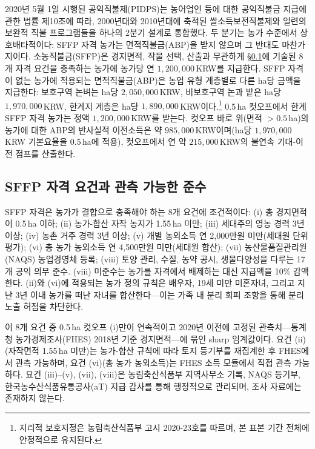 \documentclass[12pt, a4paper]{article}
\begin{document}
2020년 5월 1일 시행된 공익직불제(PIDPS)는 농어업인 등에 대한 공익직불금 지급에 관한 법률 제10조에 따라, 2000년대와 2010년대에 축적된 쌀소득보전직불제와 일련의 보완적 직불 프로그램들을 하나의 2분기 설계로 통합했다. 두 분기는 농가 수준에서 상호배타적이다: SFFP 자격 농가는 면적직불금(ABP)을 받지 않으며 그 반대도 마찬가지이다. 소농직불금(SFFP)은 경지면적, 작물 선택, 산출과 무관하게 \S\ref{sec:institutional-eligibility}에 기술된 8개 자격 요건을 충족하는 농가에 농가당 연 $1{,}200{,}000$\,KRW를 지급한다. SFFP 자격이 없는 농가에 적용되는 면적직불금(ABP)은 농업 유형 계층별로 다른 ha당 금액을 지급한다: 보호구역 논벼는 ha당 $2{,}050{,}000$\,KRW, 비보호구역 논과 밭은 ha당 $1{,}970{,}000$\,KRW, 한계지 계층은 ha당 $1{,}890{,}000$\,KRW이다.\footnote{지리적 보호지정은 농림축산식품부 고시 2020-23호를 따르며, 본 표본 기간 전체에 안정적으로 유지된다.} 0.5\,ha 컷오프에서 한계 SFFP 자격 농가는 정액 $1{,}200{,}000$\,KRW를 받는다. 컷오프 바로 위(면적 $> 0.5$\,ha)의 농가에 대한 ABP의 반사실적 이전소득은 약 $985{,}000$\,KRW이며(ha당 $1{,}970{,}000$\,KRW 기본요율을 $0.5$\,ha에 적용), 컷오프에서 연 약 $215{,}000$\,KRW의 불연속 기대-이전 점프를 산출한다.

\subsection{SFFP 자격 요건과 관측 가능한 준수}
\label{sec:institutional-eligibility}

SFFP 자격은 농가가 결합으로 충족해야 하는 8개 요건에 조건적이다: (i) 총 경지면적이 0.5\,ha 이하; (ii) 농가-합산 자작 농지가 1.55\,ha 미만; (iii) 세대주의 영농 경력 3년 이상; (iv) 농촌 거주 경력 3년 이상; (v) 개별 농외소득 연 2,000만원 미만(세대원 단위 평가); (vi) 총 농가 농외소득 연 4,500만원 미만(세대원 합산); (vii) 농산물품질관리원(NAQS) 농업경영체 등록; (viii) 토양 관리, 수질, 농약 공시, 생물다양성을 다루는 17개 공익 의무 준수. (viii) 미준수는 농가를 자격에서 배제하는 대신 지급액을 10\% 감액한다. (ii)와 (vi)에 적용되는 농가 정의 규칙은 배우자, 19세 미만 미혼자녀, 그리고 지난 3년 이내 농가를 떠난 자녀를 합산한다---이는 가족 내 분리 회피 조항을 통해 분리 노출 허점을 차단한다.

이 8개 요건 중 0.5\,ha 컷오프 (i)만이 연속적이고 2020년 이전에 고정된 관측치---통계청 농가경제조사(FHES) 2018년 기준 경지면적---에 묶인 sharp 임계값이다. 요건 (ii)(자작면적 1.55\,ha 미만)는 농가-합산 규칙에 따라 토지 등기부를 재집계한 후 FHES에서 관측 가능하며, 요건 (vi)(총 농가 농외소득)는 FHES 소득 모듈에서 직접 관측 가능하다. 요건 (iii)--(v), (vii), (viii)은 농림축산식품부 지역사무소 기록, NAQS 등기부, 한국농수산식품유통공사(aT) 지급 감사를 통해 행정적으로 관리되며, 조사 자료에는 존재하지 않는다.
\end{document}
